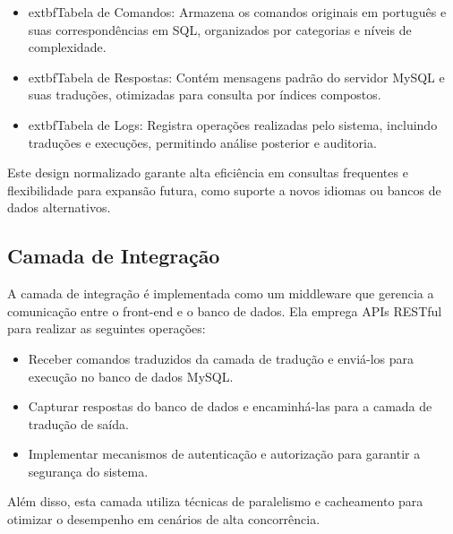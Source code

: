 \begin{itemize}
    \item 	extbf{Tabela de Comandos}: Armazena os comandos originais em português e suas correspondências em SQL, organizados por categorias e níveis de complexidade.
    \item 	extbf{Tabela de Respostas}: Contém mensagens padrão do servidor MySQL e suas traduções, otimizadas para consulta por índices compostos.
    \item 	extbf{Tabela de Logs}: Registra operações realizadas pelo sistema, incluindo traduções e execuções, permitindo análise posterior e auditoria.
\end{itemize}


Este design normalizado garante alta eficiência em consultas frequentes e flexibilidade para expansão futura, como suporte a novos idiomas ou bancos de dados alternativos.

\subsection{Camada de Integração}
A camada de integração é implementada como um middleware que gerencia a comunicação entre o front-end e o banco de dados. Ela emprega APIs RESTful para realizar as seguintes operações:

\begin{itemize}
    \item Receber comandos traduzidos da camada de tradução e enviá-los para execução no banco de dados MySQL.
    \item Capturar respostas do banco de dados e encaminhá-las para a camada de tradução de saída.
    \item Implementar mecanismos de autenticação e autorização para garantir a segurança do sistema.
\end{itemize}


Além disso, esta camada utiliza técnicas de paralelismo e cacheamento para otimizar o desempenho em cenários de alta concorrência.

